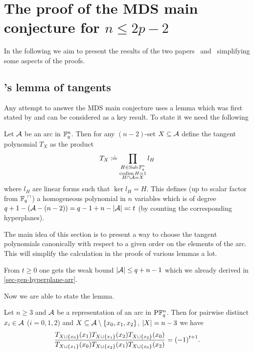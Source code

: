\section{The proof of the MDS main conjecture for $n\leq 2p-2$}%
\makeatletter%
\def\@currentlabel{Section \thesection}%
\makeatother%
\label{sec-msd-nleq2p-2}

In the following we aim to present the results of the two papers~\cite{ball2012setsI} and~\cite{ball2012setsII} simplifying some aspects of the proofs.

\subsection{'s lemma of tangents}%

Any attempt to answer the MDS main conjecture uses a lemma which was first stated by  and can be considered as a key result. To state it we need the following

\begin{definition}
    Let $\mathcal{A}$ be an arc in $\mathbb{F}_{q}^n$. Then for any $(n-2)$-set $X\subseteq \mathcal{A}$ define the tangent polynomial $T_X$ as the product
    $$
    T_X\mathrel{\mathrel{\mathop:}\mkern-1.2mu\doteq}\prod_{\substack{H\in\mathop{\mathrm{Sub}}\nolimits \mathbb{F}_{q}^n\\ \mathop\mathrm{codim}{H}=1\\ H\cap\mathcal{A}=X}}{l_H}
    $$
    where $l_H$ are linear forms such that $\ker{l_H}=H$. This defines (up to scalar factor from $\units{\field{q}}$) a homogeneous polynomial in $n$ variables which is of degree $q+1-(\mathcal{A}-(n-2))=q-1+n-\left\vert{\mathcal{A}}\right\vert\mathrel{=\mkern-1.2mu\mathrel{\mathop:}} t$ (by counting the corresponding hyperplanes).
\end{definition}

    The main idea of this section is to present a way to choose the tangent polynomials canonically with respect to a given order on the elements of the arc. This will simplify the calculation in the proofs of various lemmas a lot.

\begin{remark}
    From $t\geq 0$ one gets the weak bound $\left\vert{\mathcal{A}}\right\vert\leq q+n-1$ which we already derived in \autoref{sec-gen-hyperplane-arr}.
\end{remark}

Now we are able to state the lemma.

\begin{lemma}\label{segre-tangent-lemma-orig}
  Let $n\geq3$ and $\mathcal{A}$ be a representation of an arc in $\P \field{q}^n$. Then for pairwise distinct $x_i\in \mathcal{A}$ ($i=0,1,2$) and $X\setleq \cA\setminus\set{x_0,x_1,x_2}$, $\left\vert{X}\right\vert=n-3$ we have
  $$    \frac{T_{X\setjoin\set{x_0}}(x_1)T_{X\setjoin\set{x_1}}(x_2)T_{X\setjoin\set{x_2}}(x_0)}{T_{X\setjoin\set{x_1}}(x_0)T_{X\setjoin\set{x_2}}(x_1)T_{X\setjoin\set{x_0}}(x_2)}={(-1)}^{t+1}.
  $$
\end{lemma}

